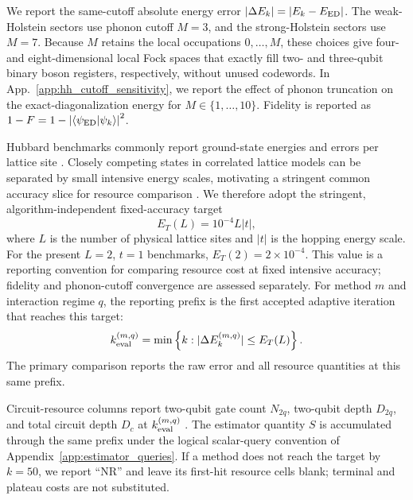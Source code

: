 \documentclass[
  reprint,
  amsmath,
  amssymb,
  aps,
  pra,
  nofootinbib,
  superscriptaddress,
  floatfix
]{revtex4-2}
\newcommand{\braket}[2]{\langle #1|#2\rangle}
\begin{document}
We report the same-cutoff absolute energy error
\(\lvert\Delta E_k\rvert=\lvert E_k-E_{\rm ED}\rvert\). The weak-Holstein
sectors use phonon cutoff \(M=3\), and the strong-Holstein sectors use \(M=7\).
Because \(M\) retains the local occupations \(0,\ldots,M\), these choices give
four- and eight-dimensional local Fock spaces that exactly fill two- and
three-qubit binary boson registers, respectively, without unused codewords.
In App.~\ref{app:hh_cutoff_sensitivity}, we report the effect of phonon
truncation on the exact-diagonalization energy for
\(M\in\{1,\ldots,10\}\). Fidelity is reported as
\(1-F=1-\left|\braket{\psi_{\rm ED}}{\psi_k}\right|^2\).

Hubbard benchmarks commonly report ground-state energies and errors per
lattice site
\cite{Alvertis2025HubbardVQE,LeBlanc2015HubbardBenchmarks,Qin2016AFQMCHubbard}.
Closely competing states in correlated lattice models can be separated by
small intensive energy scales, motivating a stringent common accuracy slice
for resource comparison \cite{LeBlanc2015HubbardBenchmarks}.
We therefore adopt the stringent, algorithm-independent fixed-accuracy target
\begin{equation}
E_T(L)=10^{-4}L\lvert t\rvert,
\label{eq:fixed_accuracy_target}
\end{equation}
where \(L\) is the number of physical lattice sites and \(\lvert t\rvert\) is
the hopping energy scale. For the present \(L=2\), \(t=1\) benchmarks,
\(E_T(2)=2\times10^{-4}\). This value is a reporting convention for comparing
resource cost at fixed intensive accuracy; fidelity and phonon-cutoff
convergence are assessed separately. For method \(m\) and interaction regime
\(q\), the reporting prefix is the first accepted adaptive iteration that
reaches this target:
\begin{equation}
k_{\rm eval}^{(m,q)}
=
\min\left\{k:\lvert\Delta E_k^{(m,q)}\rvert\le E_T(L)\right\}.
\label{eq:fixed_accuracy_prefix}
\end{equation}
The primary comparison reports the raw error and all resource quantities at
this same prefix.

Circuit-resource columns report two-qubit gate count \(N_{2q}\), two-qubit
depth \(D_{2q}\), and total circuit depth \(D_c\) at
\(k_{\rm eval}^{(m,q)}\) \cite{JavadiAbhari2024Qiskit,QiskitAlgorithmsAdaptVQE}.
The estimator quantity \(S\) is accumulated through the same prefix under the
logical scalar-query convention of Appendix~\ref{app:estimator_queries}. If a
method does not reach the target by $k=50$, we report ``NR'' and leave its
first-hit resource cells blank; terminal and plateau costs are not substituted.
\end{document}
